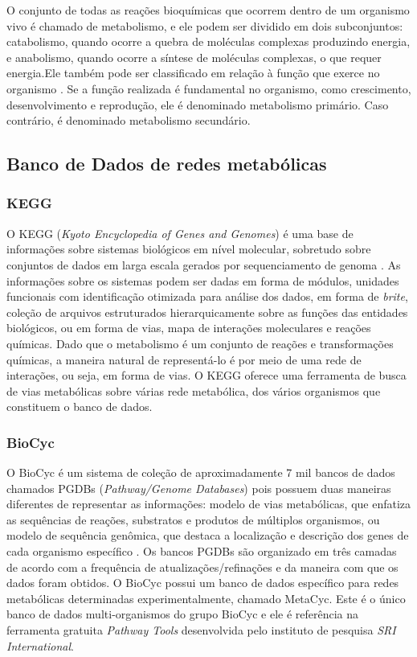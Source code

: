 \documentclass[conference]{IEEEtran}
\begin{document}
\indent O conjunto de todas as reações bioquímicas que ocorrem dentro de um organismo vivo é chamado de metabolismo, e ele podem ser dividido em dois subconjuntos: catabolismo, quando ocorre a quebra de moléculas complexas produzindo energia, e anabolismo, quando ocorre a síntese de moléculas complexas, o que requer energia.Ele também pode ser classificado em relação à função que exerce no organismo \cite{Cap3schomburg}. Se a função realizada é fundamental no organismo, como crescimento, desenvolvimento e reprodução, ele é denominado metabolismo primário. Caso contrário, é denominado metabolismo secundário.


\subsection{Banco de Dados de redes metabólicas}

\subsubsection{KEGG}
\indent O KEGG (\textit{Kyoto Encyclopedia of Genes and Genomes}) é uma base de informações sobre sistemas biológicos em nível molecular, sobretudo sobre conjuntos de dados em larga escala gerados por sequenciamento de genoma \cite{keggOverview}. As informações sobre os sistemas podem ser dadas em forma de módulos, unidades funcionais com identificação otimizada para análise dos dados, em forma de \textit{brite}, coleção de arquivos estruturados hierarquicamente sobre as funções das entidades biológicos, ou em forma de vias, mapa de interações moleculares e reações químicas. Dado que o metabolismo é um conjunto de reações e transformações químicas, a maneira natural de representá-lo é por meio de uma rede de interações, ou seja, em forma de vias. O KEGG oferece uma ferramenta de busca de vias metabólicas sobre várias rede metabólica, dos vários organismos que constituem o banco de dados.

\subsubsection{BioCyc}
\indent O BioCyc é um sistema de coleção de aproximadamente 7 mil bancos de dados chamados PGDBs (\textit{Pathway/Genome Databases}) pois possuem duas maneiras diferentes de representar as informações: modelo de vias metabólicas, que enfatiza as sequências de reações, substratos e produtos de múltiplos organismos, ou modelo de sequência genômica, que destaca a localização e descrição dos genes de cada organismo específico \cite{biocycIntro}. Os bancos PGDBs são organizado em três camadas de acordo com a frequência de atualizações/refinações e da maneira com que os dados foram obtidos. O BioCyc possui um banco de dados específico para redes metabólicas determinadas experimentalmente, chamado MetaCyc. Este é o único banco de dados multi-organismos do grupo BioCyc e ele é referência na ferramenta gratuita \textit{Pathway Tools} desenvolvida pelo instituto de pesquisa \textit{SRI International}.
\end{document}
